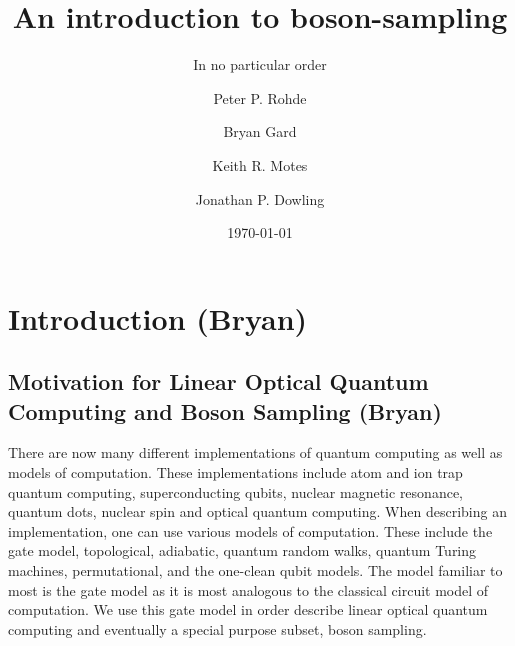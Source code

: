 \documentclass[aps,pra,twocolumn,amsmath,amssymb,nofootinbib,superscriptaddress]{revtex4}
\begin{document}


%
% 

\title{An introduction to boson-sampling}

%
%

\author{In no particular order}

\author{Peter P. Rohde}

\author{Bryan Gard}

\author{Keith R. Motes}

\author{Jonathan P. Dowling}

\date{\today}

\frenchspacing

%
%

\begin{abstract}
\end{abstract}

\maketitle

\section{Introduction (Bryan)}

\subsection{Motivation for Linear Optical Quantum Computing and Boson Sampling (Bryan)}
There are now many different implementations of quantum computing as well as models of computation. These implementations include atom and ion trap quantum computing, superconducting qubits, nuclear magnetic resonance, quantum dots, nuclear spin and optical quantum computing. When describing an implementation, one can use various models of computation. These include the gate model, topological, adiabatic, quantum random walks, quantum Turing machines, permutational, and the one-clean qubit models. The model familiar to most is the gate model as it is most analogous to the classical circuit model of computation. We use this gate model in order describe linear optical quantum computing and eventually a special purpose subset, boson sampling.
\end{document}
